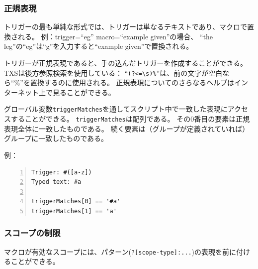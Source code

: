 \subsubsection{正規表現}

トリガーの最も単純な形式では、トリガーは単なるテキストであり、マクロで置換される。
例：trigger=``eg'' macro=``example given''の場合、
``the leg''の``eg''は``g''を入力すると``example given''で置換される。

トリガーが正規表現であると、手の込んだトリガーを作成することができる。
TXSは後方参照検索を使用している：
``\verb+(?<=\s)%+''は、前の文字が空白なら``\%''を置換するのに使用される。
正規表現についてのさらなるヘルプはインターネット上で見ることができる。

グローバル変数\verb+triggerMatches+を通してスクリプト中で一致した表現にアクセスすることができる。
\verb+triggerMatches+は配列である。
その0番目の要素は正規表現全体に一致したものである。
続く要素は（グループが定義されていれば）グループに一致したものである。

例：

\begin{lstlisting}[frame=single,breaklines=true,numbers=left]
Trigger: #([a-z])
Typed text: #a

triggerMatches[0] == '#a'
triggerMatches[1] == 'a'
\end{lstlisting}

\subsubsection{スコープの制限}

%
%

マクロが有効なスコープには、パターン(\verb+?[scope-type]:...+)の表現を前に付けることができる。

